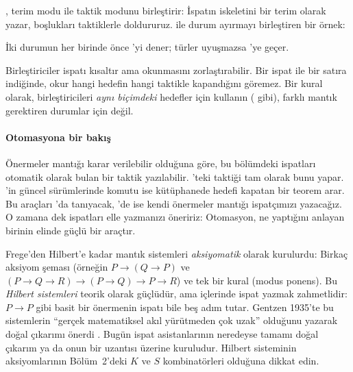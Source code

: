 , terim modu ile taktik modunu birleştirir: İspatın
iskeletini bir terim olarak yazar, boşlukları taktiklerle doldururuz.
 ile durum ayırmayı birleştiren bir örnek:


\noindent İki durumun her birinde \Lean{} önce 'yi dener;
türler uyuşmazsa 'ye geçer.

\begin{dikkat}
Birleştiriciler ispatı kısaltır ama okunmasını zorlaştırabilir. Bir
ispat \lc{<;>} ile bir satıra indiğinde, okur hangi hedefin hangi
taktikle kapandığını göremez. Bir kural olarak, birleştiricileri
\emph{aynı biçimdeki} hedefler için kullanın ( gibi), farklı mantık gerektiren durumlar için değil.
\end{dikkat}

\paragraph{Otomasyona bir bakış}
Önermeler mantığı karar verilebilir olduğuna göre, bu bölümdeki
ispatları otomatik olarak bulan bir taktik yazılabilir. \Mathlib{}'teki
 taktiği tam olarak bunu yapar. \Lean{}'in güncel
sürümlerinde  komutu ise kütüphanede hedefi kapatan bir
teorem arar. Bu araçları 'da tanıyacak,
'de ise kendi önermeler mantığı ispatçımızı
yazacağız. O zamana dek ispatları elle yazmanızı öneririz: Otomasyon,
ne yaptığını anlayan birinin elinde güçlü bir araçtır.

\begin{tarihce}
Frege'den Hilbert'e kadar mantık sistemleri \emph{aksiyomatik} olarak
kurulurdu: Birkaç aksiyom şeması (örneğin
$P \to (Q \to P)$ ve $(P \to Q \to R) \to (P \to Q) \to P \to R$) ve
tek bir kural (modus ponens). Bu \emph{Hilbert sistemleri} teorik olarak
güçlüdür, ama içlerinde ispat yazmak zahmetlidir: $P \to P$ gibi basit
bir önermenin ispatı bile beş adım tutar. Gentzen 1935'te bu sistemlerin
``gerçek matematiksel akıl yürütmeden çok uzak'' olduğunu yazarak doğal
çıkarımı önerdi \citep{gentzen1935}. Bugün ispat asistanlarının
neredeyse tamamı doğal çıkarım ya da onun bir uzantısı üzerine kuruludur.
Hilbert sisteminin aksiyomlarının Bölüm~2'deki $K$ ve $S$
kombinatörleri olduğuna dikkat edin.
\end{tarihce}

